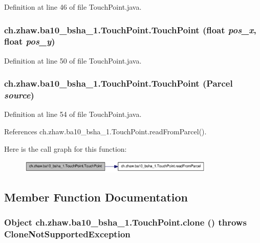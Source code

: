 Definition at line 46 of file TouchPoint.java.\hypertarget{classch_1_1zhaw_1_1ba10__bsha__1_1_1TouchPoint_a17cb410a388f8ca317ac65f981eac6ec}{
\subsubsection[{TouchPoint}]{\setlength{\rightskip}{0pt plus 5cm}ch.zhaw.ba10\_\-bsha\_\-1.TouchPoint.TouchPoint (float {\em pos\_\-x}, \/  float {\em pos\_\-y})}}
\label{classch_1_1zhaw_1_1ba10__bsha__1_1_1TouchPoint_a17cb410a388f8ca317ac65f981eac6ec}


Definition at line 50 of file TouchPoint.java.\hypertarget{classch_1_1zhaw_1_1ba10__bsha__1_1_1TouchPoint_ad882a2ee5e211bfefaa73c1322cf1823}{
\subsubsection[{TouchPoint}]{\setlength{\rightskip}{0pt plus 5cm}ch.zhaw.ba10\_\-bsha\_\-1.TouchPoint.TouchPoint (Parcel {\em source})}}
\label{classch_1_1zhaw_1_1ba10__bsha__1_1_1TouchPoint_ad882a2ee5e211bfefaa73c1322cf1823}


Definition at line 54 of file TouchPoint.java.

References ch.zhaw.ba10\_\-bsha\_\-1.TouchPoint.readFromParcel().

Here is the call graph for this function:\nopagebreak
\begin{figure}[H]
\begin{center}
\leavevmode
\includegraphics[width=265pt]{classch_1_1zhaw_1_1ba10__bsha__1_1_1TouchPoint_ad882a2ee5e211bfefaa73c1322cf1823_cgraph}
\end{center}
\end{figure}


\subsection{Member Function Documentation}
\hypertarget{classch_1_1zhaw_1_1ba10__bsha__1_1_1TouchPoint_ac71c9f7fa232435af2314d0d707e7559}{
\subsubsection[{clone}]{\setlength{\rightskip}{0pt plus 5cm}Object ch.zhaw.ba10\_\-bsha\_\-1.TouchPoint.clone ()  throws CloneNotSupportedException }}
\label{classch_1_1zhaw_1_1ba10__bsha__1_1_1TouchPoint_ac71c9f7fa232435af2314d0d707e7559}


